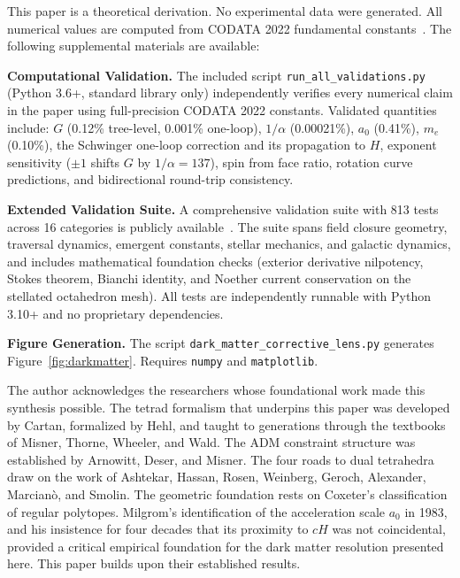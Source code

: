 \documentclass[aps,prd,preprint,superscriptaddress,showpacs,preprintnumbers,amsmath,amssymb,nofootinbib]{revtex4-2}
\begin{document}
This paper is a theoretical derivation. No experimental data were generated. All numerical values are computed from CODATA 2022 fundamental constants~\cite{codata2022}. The following supplemental materials are available:

\textbf{Computational Validation.}\quad
The included script \texttt{run\_all\_validations.py} (Python 3.6+, standard library only) independently verifies every numerical claim in the paper using full-precision CODATA 2022 constants. Validated quantities include: $G$ (0.12\% tree-level, 0.001\% one-loop), $1/\alpha$ (0.00021\%), $a_0$ (0.41\%), $m_e$ (0.10\%), the Schwinger one-loop correction and its propagation to $H$, exponent sensitivity ($\pm 1$ shifts $G$ by $1/\alpha = 137$), spin from face ratio, rotation curve predictions, and bidirectional round-trip consistency.

\textbf{Extended Validation Suite.}\quad
A comprehensive validation suite with 813 tests across 16 categories is publicly available~\cite{gfm-repo}. The suite spans field closure geometry, traversal dynamics, emergent constants, stellar mechanics, and galactic dynamics, and includes mathematical foundation checks (exterior derivative nilpotency, Stokes theorem, Bianchi identity, and Noether current conservation on the stellated octahedron mesh). All tests are independently runnable with Python 3.10+ and no proprietary dependencies.

\textbf{Figure Generation.}\quad
The script \texttt{dark\_matter\_corrective\_lens.py} generates Figure~\ref{fig:darkmatter}. Requires \texttt{numpy} and \texttt{matplotlib}.

\begin{acknowledgments}
The author acknowledges the researchers whose foundational work made this synthesis possible. The tetrad formalism that underpins this paper was developed by Cartan, formalized by Hehl, and taught to generations through the textbooks of Misner, Thorne, Wheeler, and Wald. The ADM constraint structure was established by Arnowitt, Deser, and Misner. The four roads to dual tetrahedra draw on the work of Ashtekar, Hassan, Rosen, Weinberg, Geroch, Alexander, Marcian\`o, and Smolin. The geometric foundation rests on Coxeter's classification of regular polytopes. Milgrom's identification of the acceleration scale $a_0$ in 1983, and his insistence for four decades that its proximity to $cH$ was not coincidental, provided a critical empirical foundation for the dark matter resolution presented here. This paper builds upon their established results.
\end{acknowledgments}
\end{document}
